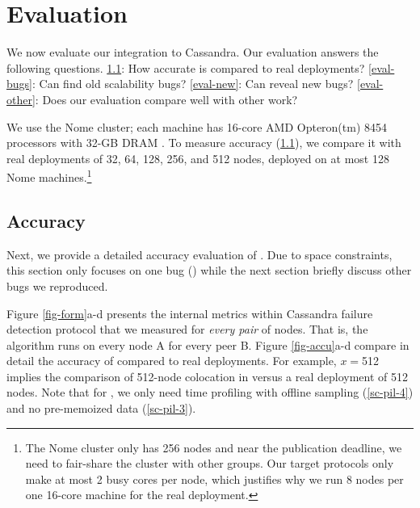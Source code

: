 
\section{Evaluation}
\label{sec-eval}


We now evaluate our \sck integration to Cassandra. Our evaluation answers the
following questions.
%
\sec\ref{eval-accu}: How accurate is \sck compared to real deployments?
%
\sec\ref{eval-bugs}: Can \sck find old scalability bugs?
%
\sec\ref{eval-new}: Can \sck reveal new bugs?
%
%
\sec\ref{eval-other}: Does our evaluation compare well with other work?


We use the Nome cluster; each machine has 16-core AMD Opteron(tm) 8454
processors with 32-GB DRAM \cite{NomeNodes}.
%
To measure \sck accuracy (\sec\ref{eval-accu}), we compare it with real
deployments of 32, 64, 128, 256, and 512 nodes, deployed on at most 128 Nome
machines.\footnote{The Nome cluster only has 256 nodes and near the publication
deadline, we need to fair-share the cluster with other groups.  Our target
protocols only make at most 2 busy cores per node, which justifies why we run 8
nodes per one 16-core machine for the real deployment.}
%

\subsection{Accuracy}
\label{eval-accu}

\def \fff        {$f$}
\def \flaps      {\textit{\#flaps}\xspace}
\def \gosLast    {$T_{lastGossip}$\xspace}
\def \gosAvg     {$T_{avgGossip}$\xspace}
\def \gosProc    {$T_{gossipExec}$\xspace}
\def \supProc    {$T_{stateUpdate}$\xspace}
\def \hops       {\textit{\#hops}\xspace}

\def \ringTable  {$Size_{ringTable}$\xspace}
\def \newStates  {$Size_{newStates}$\xspace}
\def \cpuSpeed   {$CPU$\xspace}


Next, we provide a detailed accuracy evaluation of \sck.  Due to space
constraints, this section only focuses on one bug (\caone \cite{CA-One}) 
while the next
section briefly discuss other bugs we reproduced.




Figure \ref{fig-form}a-d presents the  internal metrics within
Cassandra failure detection protocol that we measured for {\em every pair}
of nodes.  That is, the algorithm runs on every node A for every peer B.
%
Figure \ref{fig-accu}a-d compare in detail the accuracy of \sck compared
to real deployments.
%
For example, $x$$=$512 implies the comparison of 512-node colocation in
\sck versus a real deployment of 512 nodes.
%
Note that for \caone, we only need time profiling with offline sampling
(\sec\ref{sc-pil-4}) and no pre-memoized data (\sec\ref{sc-pil-3}).  
%


